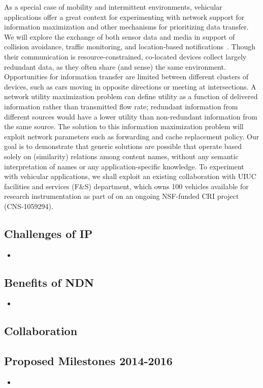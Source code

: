As a special case of mobility and intermittent environments, vehicular applications offer a great context for experimenting with network support for information maximization and other mechanisms for prioritizing data transfer.  
We will explore the exchange of both sensor data and media in support of collision avoidance, traffic monitoring, and location-based notifications~\cite{karagiannis2011vehicular}.  Though their communication is resource-constrained, co-located devices collect largely redundant data, as they often share (and sense) the same environment.  Opportunities for information transfer are limited between different clusters of devices, such as cars moving in opposite directions or meeting at intersections. A network utility maximization problem can define utility as a function of delivered information rather than transmitted flow rate; redundant information from different sources would have a lower utility than non-redundant information from the same source. The solution to this information maximization problem will exploit network parameters such as forwarding and cache replacement policy. Our goal is to demonstrate that generic solutions are possible that operate based solely on (similarity) relations among content names, without any semantic interpretation of names or any application-specific knowledge. 
To experiment with vehicular applications, we shall exploit an existing
collaboration with UIUC facilities and services (F\&S) department, which owns
100 vehicles available for research instrumentation as part of
on an ongoing NSF-funded CRI project (CNS-1059294).


\subsection{Challenges of IP}

\begin{itemize}
 \item
\end{itemize}

\subsection{Benefits of NDN}

\begin{itemize}
\item
\end{itemize}

\subsection{Collaboration}

\subsection{Proposed Milestones 2014-2016}
\begin{itemize}
\item
\end{itemize}


